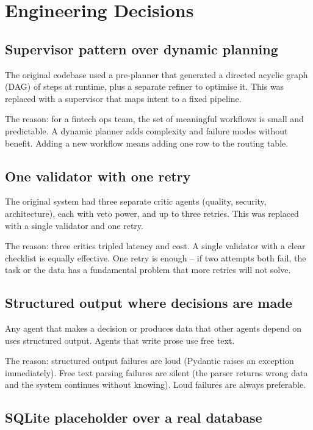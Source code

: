 \documentclass[12pt,a4paper]{article}
\begin{document}
\section{Engineering Decisions}

\subsection{Supervisor pattern over dynamic planning}

The original codebase used a pre-planner that generated a directed acyclic graph (DAG) of steps at runtime, plus a separate refiner to optimise it. This was replaced with a supervisor that maps intent to a fixed pipeline.

The reason: for a fintech ops team, the set of meaningful workflows is small and predictable. A dynamic planner adds complexity and failure modes without benefit. Adding a new workflow means adding one row to the routing table.

\subsection{One validator with one retry}

The original system had three separate critic agents (quality, security, architecture), each with veto power, and up to three retries. This was replaced with a single validator and one retry.

The reason: three critics tripled latency and cost. A single validator with a clear checklist is equally effective. One retry is enough -- if two attempts both fail, the task or the data has a fundamental problem that more retries will not solve.

\subsection{Structured output where decisions are made}

Any agent that makes a decision or produces data that other agents depend on uses structured output. Agents that write prose use free text.

The reason: structured output failures are loud (Pydantic raises an exception immediately). Free text parsing failures are silent (the parser returns wrong data and the system continues without knowing). Loud failures are always preferable.

\subsection{SQLite placeholder over a real database}
\end{document}
